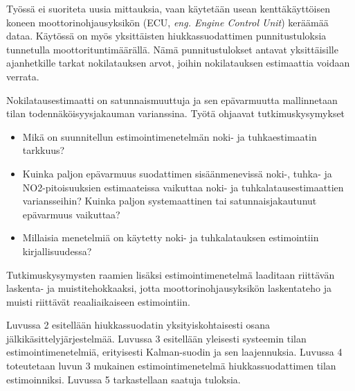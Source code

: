 Työssä ei suoriteta uusia mittauksia, vaan käytetään usean kenttäkäyttöisen koneen moottorinohjausyksikön (ECU, \emph{eng. Engine Control Unit}) keräämää dataa. Käytössä on myös yksittäisten hiukkassuodattimen punnitustuloksia tunnetulla moottorituntimäärällä. Nämä punnitustulokset antavat yksittäisille ajanhetkille tarkat nokilatauksen arvot, joihin nokilatauksen estimaattia voidaan verrata.

Nokilatausestimaatti on satunnaismuuttuja ja sen epävarmuutta mallinnetaan tilan todennäköisyysjakauman varianssina. Työtä ohjaavat tutkimuskysymykset
\begin{itemize}

    
    \item Mikä on suunnitellun estimointimenetelmän noki- ja tuhkaestimaatin tarkkuus? %

    \item Kuinka paljon epävarmuus suodattimen sisäänmenevissä noki-, tuhka- ja NO2-pitoisuuksien estimaateissa vaikuttaa noki- ja tuhkalatausestimaattien variansseihin? Kuinka paljon systemaattinen tai satunnaisjakautunut epävarmuus vaikuttaa?
    
    \item Millaisia menetelmiä on käytetty noki- ja tuhkalatauksen estimointiin kirjallisuudessa? %
    

\end{itemize}
Tutkimuskysymysten raamien lisäksi estimointimenetelmä laaditaan riittävän laskenta- ja muistitehokkaaksi, jotta moottorinohjausyksikön laskentateho ja muisti riittävät reaaliaikaiseen estimointiin.


 

Luvussa 2 esitellään hiukkassuodatin yksityiskohtaisesti osana jälkikäsittelyjärjestelmää.
Luvussa 3 esitellään yleisesti systeemin tilan estimointimenetelmiä, erityisesti Kalman-suodin ja sen laajennuksia.
Luvussa 4 toteutetaan luvun 3 mukainen estimointimenetelmä hiukkassuodattimen tilan estimoinniksi. Luvussa 5 tarkastellaan saatuja tuloksia.